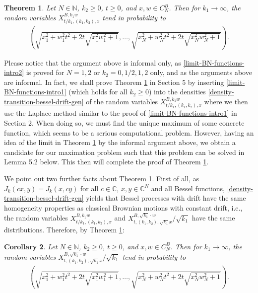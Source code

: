 \documentclass[reqno]{amsart}
\theoremstyle{plain}
\newtheorem{theorem}{Theorem}[section]
\newtheorem{corollary}[theorem]{Corollary}
\theoremstyle{definition}
\numberwithin{equation}{section}
\newcommand{\N}{\mathbb{N}}
\begin{document}
\begin{theorem}\label{limit-processes-intro}
Let $N \in \N$, $k_2 \geq 0$, $t \geq 0$, and $x,w \in C_N^B$. 
Then for $k_1 \to \infty$,  the random variables $X^{B,k_1 w}_{t/k_1,(k_1,k_2),x}$ tend in probability to
\begin{align*}
\left( \sqrt{x_1^2 + w_1^2 t^2 + 2t \sqrt{x_1^2 w_1^2 + 1}}, \ldots, \sqrt{x_N^2 + w_N^2 t^2 + 2t \sqrt{x_N^2 w_N^2 + 1}} \right) .
\end{align*}
\end{theorem}

Please notice that the argument above is informal only, as \eqref{limit-BN-functions-intro2}
is proved for $N=1,2$ or $k_2=0,1/2,1,2$ only, and as the arguments above are  informal. In fact, we shall prove
Theorem \ref{limit-processes-intro} in Section 5 by inserting  \eqref{limit-BN-functions-intro1} (which holds for all $k_2\ge0$)
into the densities  \eqref{density-transition-bessel-drift-gen} of the random variables $X^{B,k_1 w}_{t/k_1,(k_1,k_2),x}$
where we then use the Laplace method similar to the proof of   \eqref{limit-BN-functions-intro1} in Section 2.
When doing so, we must find the unique maximum of some concrete function, which seems to be a serious computational problem. However, having 
an idea of the limit in Theorem \ref{limit-processes-intro} by the informal argument above, we obtain a candidate for our maximation problem such that
this problem can be solved in Lemma 5.2 below.  This then will complete the proof of Theorem \ref{limit-processes-intro}.


We point out two further facts about  Theorem \ref{limit-processes-intro}.
First of all, as $J_k(cx,y)=J_k(x,cy)$ for all $c\in\mathbb C$, $x,y\in\mathbb C^N$ and all Bessel functions,
\eqref{density-transition-bessel-drift-gen} yields that Bessel processes with drift have the same 
homogeneity properties as classical Brownian motions with constant drift, i.e., the random variables $X^{B,k_1 w}_{t/k_1,(k_1,k_2),x}$ and
$X^{B,\sqrt{k_1}\cdot w}_{t,(k_1,k_2),\sqrt{k_1}x}/\sqrt{k_1}$ have the same distributions. Therefore, by Theorem \ref{limit-processes-intro}:

\begin{corollary} \label{limit-processes-intro-cor} 
Let  $N \in \N$, $k_2\ge0$, $t \geq 0$, and $x,w \in C_N^B$. 
Then for $k_1 \to \infty$,  the random variables $X^{B,\sqrt{k_1}\cdot w}_{t,(k_1,k_2),\sqrt{k_1}x}/\sqrt{k_1}$ tend in probability to
\begin{align*}
\left( \sqrt{x_1^2 + w_1^2 t^2 + 2t \sqrt{x_1^2 w_1^2 + 1}}, \ldots, \sqrt{x_N^2 + w_N^2 t^2 + 2t \sqrt{x_N^2 w_N^2 + 1}} \right) .
\end{align*}
\end{corollary}
\end{document}
